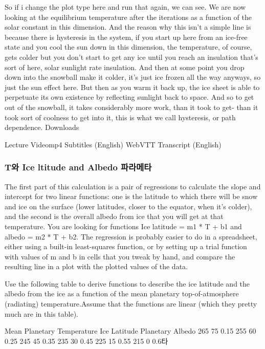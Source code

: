 {So if i change the plot type here and run that again, we can see. We are now looking at the equilibrium temperature after the iterations as a function of the solar constant in this dimension. And the reason why this isn't a simple line is because there is hysteresis in the system, if you start up here from an ice-free state and you cool the sun down in this dimension, the temperature, of course, gets colder but you don't start to get any ice until you reach an insulation that's sort of here, solar sunlight rate insulation. And then at some point you drop down into the snowball make it colder, it's just ice frozen all the way anyways, so just the sun effect here. But then as you warm it back up, the ice sheet is able to perpetuate its own existence by reflecting sunlight back to space. And so to get out of the snowball, it takes considerably more work, than it took to get- than it took sort of coolness to get into it, this is what we call hysteresis, or path dependence. 
Downloads

Lecture Videomp4
Subtitles (English)
WebVTT
Transcript (English)


\subsubsection{T와 Ice ltitude and Albedo 파라메타}\index{}

The first part of this calculation is a pair of regressions to calculate the slope and intercept for two linear functions: one is the latitude to which there will be snow and ice on the surface (lower latitudes, closer to the equator, when it’s colder), and the second is the overall albedo from ice that you will get at that temperature. You are looking for functions Ice latitude = m1 * T + b1 and albedo = m2 * T + b2. The regression is probably easier to do in a spreadsheet, either using a built-in least-squares function, or by setting up a trial function with values of m and b in cells that you tweak by hand, and compare the resulting line in a plot with the plotted values of the data.

Use the following table to derive functions to describe the ice latitude and the albedo from the ice as a function of the mean planetary top-of-atmosphere (radiating) temperature.Assume that the functions are linear (which they pretty much are in this table).

Mean Planetary Temperature	Ice Latitude	Planetary Albedo
265	75	0.15
255	60	0.25
245	45	0.35
235	30	0.45
225	15	0.55
215	0	0.6타

}
